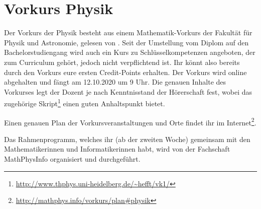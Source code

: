 \section{Vorkurs Physik}
Der Vorkurs der Physik besteht aus einem Mathematik-Vorkurs der Fakultät für Physik und Astronomie, gelesen von \dozentvorkurs. Seit der Umstellung vom Diplom auf den Bachelorstudiengang wird auch ein Kurs zu Schlüsselkompetenzen angeboten, der zum Curriculum gehört, jedoch nicht verpflichtend ist. Ihr könnt also bereits durch den Vorkurs eure ersten Credit-Points erhalten. Der Vorkurs wird online abgehalten und fängt am 12.10.2020 um 9 Uhr. Die genauen Inhalte des Vorkurses legt der Dozent je nach Kenntnisstand der Hörerschaft fest, wobei das zugehörige Skript\footnote{\url{http://www.thphys.uni-heidelberg.de/~hefft/vk1/}} einen guten Anhaltspunkt bietet.

Einen genauen Plan der Vorkursveranstaltungen und Orte findet ihr im Internet\footnote{\url{http://mathphys.info/vorkurs/plan\#physik}}.

Das Rahmenprogramm, welches ihr (ab der zweiten Woche) gemeinsam mit den Mathematikerinnen und Informatikerinnen habt, wird von der Fachschaft MathPhysInfo organisiert und durchgeführt.

